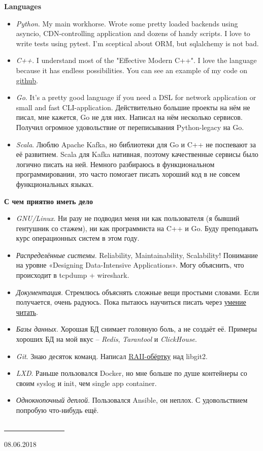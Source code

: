 \documentclass[final]{letter}
\begin{document}
{\bf Languages}
\begin{itemize}
\item \textit{Python}. My main workhorse. Wrote some pretty loaded backends using asyncio, CDN-controlling application and dozens of handy scripts. I love to write tests using pytest. I'm sceptical about ORM, but sqlalchemy is not bad.
\item \textit{C++}. I understand most of the "Effective Modern C++". I love the language because it has endless possibilities. You can see an example of my code on \href{https://github.com/neexee/review}{github}.
\item \textit{Go}. It's a pretty good language if you need a DSL for network application or small and fast CLI-application. Действительно большие проекты на нём не писал, мне кажется, Go не для них. Написал на нём несколько сервисов. Получил огромное удовольствие от переписывания Python-legacy на Go.
\item \textit{Scala}. Люблю Apache Kafka, но библиотеки для Go и C++ не поспевают за её развитием. Scala для Kafka нативная, поэтому качественные сервисы было логично писать на ней. Немного разбираюсь в функциональном программировании, это часто помогает писать хороший код в не совсем функциональных языках.
\end{itemize}

{\bf С чем приятно иметь дело}
\begin{itemize}
\item \textit{GNU/Linux}. Ни разу не подводил меня ни как пользователя (я бывший гентушник со стажем), ни как программиста на C++ и Go. Буду преподавать курс операционных систем в этом году.
\item \textit{Распределённые системы}. Reliability, Maintainability, Scalability! Понимание на уровне «Designing Data-Intensive Applications». Могу объяснить, что происходит в tcpdump + wireshark.
\item \textit{Документация}. Стремлюсь объяснять сложные вещи простыми словами. Если получается, очень радуюсь. Пока пытаюсь научиться писать через \href{https://www.goodreads.com/review/list/43338630-sergey-machulskis?shelf=professional}{умение читать}.
\item \textit{Базы данных}. Хорошая БД снимает головную боль, а не создаёт её. Примеры хороших БД на мой вкус -- \textit{Redis}, \textit{Tarantool} и \textit{ClickHouse}.
\item \textit{Git}. Знаю десяток команд. Написал \href{https://github.com/neexee/review/tree/master/components/Git}{RAII-обёртку} над libgit2.
\item \textit{LXD}. Раньше пользовался Docker, но мне больше по душе контейнеры со своим syslog и init, чем single app container.
\item \textit{Однокнопочный деплой}. Пользовался Ansible, он неплох. С удовольствием попробую что-нибудь ещё.
\end{itemize}

\vfill
\begin{center}
\underline{~~~~~~~~~~~~~~~~~}

08.06.2018
\end{center}
\end{document}
